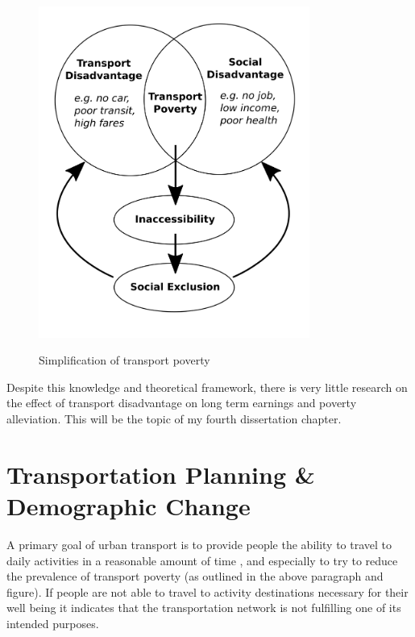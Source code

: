 \begin{figure}[h]
	\centering
	\caption{{Simplification of transport poverty}}
	\includegraphics[width=3.5in]{figures/tpov.png}
	\label{tpov}
\end{figure}

Despite this knowledge and theoretical framework, there is very little research on the effect of transport disadvantage on long term earnings and poverty alleviation. This will be the topic of my fourth dissertation chapter.







\section{Transportation Planning \& Demographic Change}


A primary goal of urban transport is to provide people the ability to travel to daily activities in a reasonable amount of time \cite{martens_transport_2016}, and especially to try to reduce the prevalence of transport poverty (as outlined in the above paragraph and figure). If people are not able to travel to activity destinations necessary for their well being it indicates that the transportation network is not fulfilling one of its intended purposes. 

